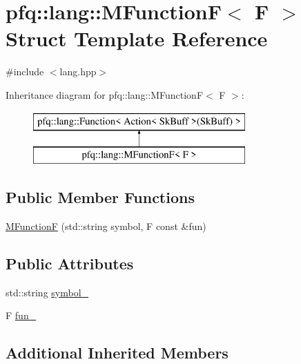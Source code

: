 \hypertarget{structpfq_1_1lang_1_1MFunctionF}{\section{pfq\+:\+:lang\+:\+:M\+Function\+F$<$ F $>$ Struct Template Reference}
\label{structpfq_1_1lang_1_1MFunctionF}
}


{\ttfamily \#include $<$lang.\+hpp$>$}

Inheritance diagram for pfq\+:\+:lang\+:\+:M\+Function\+F$<$ F $>$\+:\begin{figure}[H]
\begin{center}
\leavevmode
\includegraphics[height=2.000000cm]{structpfq_1_1lang_1_1MFunctionF}
\end{center}
\end{figure}
\subsection*{Public Member Functions}
\begin{DoxyCompactItemize}
\item 
\hyperlink{structpfq_1_1lang_1_1MFunctionF_a68fc8676434dbd8ff982c8473d2634ae}{M\+Function\+F} (std\+::string symbol, F const \&fun)
\end{DoxyCompactItemize}
\subsection*{Public Attributes}
\begin{DoxyCompactItemize}
\item 
std\+::string \hyperlink{structpfq_1_1lang_1_1MFunctionF_a84398a35106783f51ad3f7dd45b13c8f}{symbol\+\_\+}
\item 
F \hyperlink{structpfq_1_1lang_1_1MFunctionF_a6f406f1f494eb45012b61cff338818b3}{fun\+\_\+}
\end{DoxyCompactItemize}
\subsection*{Additional Inherited Members}


